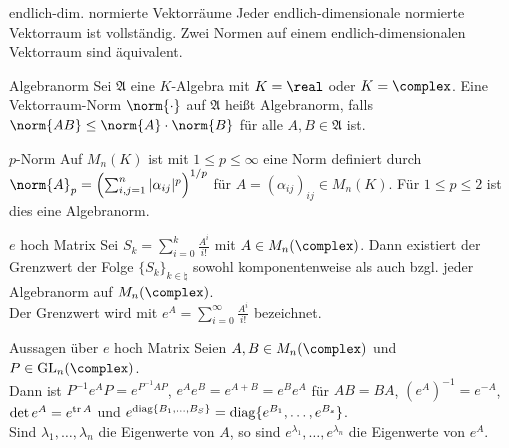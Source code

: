 \begin{Satz}{endlich-dim. normierte Vektorräume}
    Jeder endlich-dimensionale normierte Vektorraum ist vollständig.
    Zwei Normen auf einem endlich-dimensionalen Vektorraum sind äquivalent.
\end{Satz}

\begin{Def}{Algebranorm}
    Sei $\mathfrak{A}$ eine $K$-Algebra mit $K = \real$ oder $K = \complex$.
    Eine Vektorraum-Norm $\norm{\cdot}$ auf $\mathfrak{A}$ heißt Algebranorm,
    falls $\norm{AB} \le \norm{A} \cdot \norm{B}$ für alle
    $A, B \in \mathfrak{A}$ ist.
\end{Def}

\begin{Def}{$p$-Norm}
    Auf $M_n(K)$ ist mit $1 \le p \le \infty$ eine Norm definiert durch
    $\norm{A}_p = \left(\sum_{i,j=1}^n |\alpha_{ij}|^p\right)^{1/p}$
    für $A = (\alpha_{ij})_{ij} \in M_n(K)$.
    Für $1 \le p \le 2$ ist dies eine Algebranorm.
\end{Def}

\begin{Def}{$e$ hoch Matrix}
    Sei $S_k = \sum_{i=0}^k \frac{A^i}{i!}$ mit $A \in M_n(\complex)$.
    Dann existiert der Grenzwert der Folge $\{S_k\}_{k \in \natural}$ sowohl
    komponentenweise als auch bzgl. jeder Algebranorm auf $M_n(\complex)$. \\
    Der Grenzwert wird mit $e^A = \sum_{i=0}^\infty \frac{A^i}{i!}$
    bezeichnet.
\end{Def}

\begin{Satz}{Aussagen über $e$ hoch Matrix}
    Seien $A, B \in M_n(\complex)$ und $P \in \GL_n(\complex)$. \\
    Dann ist $P^{-1} e^A P = e^{P^{-1} A P}$, \qquad
    $e^A e^B = e^{A + B} = e^B e^A$ für $AB = BA$, \qquad
    $(e^A)^{-1} = e^{-A}$, \\
    $\det e^A = e^{\operatorname{tr} A}$ \quad und \quad
    $e^{\operatorname{diag}\{B_1, \dotsc, B_S\}} = \operatorname{diag}\{e^{B_1}, \dotsc, e^{B_s}\}$. \\
    Sind $\lambda_1, \dotsc, \lambda_n$ die Eigenwerte von $A$, so sind
    $e^{\lambda_1}, \dotsc, e^{\lambda_n}$ die Eigenwerte von $e^A$.
\end{Satz}

